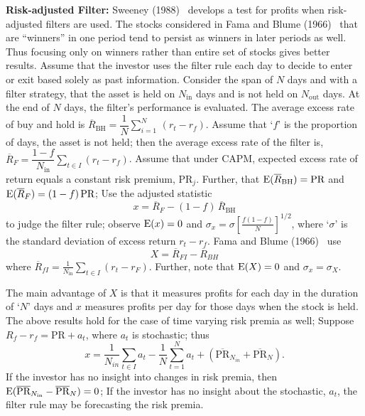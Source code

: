 \noindent \textbf{Risk-adjusted Filter:} Sweeney (1988)~\cite{sweet} develops a test for profits when risk-adjusted filters are used. The stocks considered in Fama and Blume (1966)~\cite{famablume} that are ``winners'' in one period tend to persist as winners in later periods as well. Thus focusing only on winners rather than entire set of stocks gives better results. Assume that the investor uses the filter rule each day to decide to enter or exit based solely as past information. Consider the span of $N$ days and with a filter strategy, that the asset is held on $N_{\text{in}}$ days and is not held on $N_{\text{out}}$ days. At the end of $N$ days, the filter's performance is evaluated. The average excess rate of buy and hold is $\overline{R}_{\text{BH}}=\dfrac{1}{N} \sum_{i=1}^N \, (r_t - r_f )$. Assume that `$f$' is the proportion of days, the asset is not held; then the average excess rate of the filter is, $\overline{R}_{F}=\dfrac{1-f}{N_{\text{in}}} \sum_{t \in I} (r_t - r_f)$. Assume that under CAPM, expected excess rate of return equals a constant risk premium, $\text{PR}_{j}$. Further, that $\operatorname{E}(\overline{R}_{\text{BH}}) = \text{PR}$ and $\operatorname{E}(\overline{R}_{F}) = (1 - f)\,\text{PR}$; Use the adjusted statistic
	\begin{equation} \label{eqn:xbarfirst}
	x= \overline{R}_{F} - (1 - f)\, \overline{R}_{\text{BH}}
	\end{equation}
to judge the filter rule; observe $\operatorname{E}(x) = 0$ and $\sigma_{x} = \sigma[\frac{f(1-f)}{N}]^{1/2}$, where `$\sigma$' is the standard deviation of excess return $r_t - r_f$. Fama and Blume (1966)~\cite{famablume} use
	\begin{equation} \label{eqn:bigxbar}
	X = \overline{R}_{FI} - \overline{R}_{BH}
	\end{equation}
where $\overline{R}_{fI} = \frac{1}{N_{\text{in}}} \sum_{t \in I}(r_t - r_F)$. Further, note that $\operatorname{E}(X) = 0$ and $\sigma_{x} = \sigma_{X}$.


The main advantage of $X$ is that it measures profits for each day in the duration of `$N$' days and $x$ measures profits per day for those days when the stock is held. The above results hold for the case of time varying risk premia as well; Suppose $R_f - r_f = \text{PR} + a_t$, where $a_t$ is stochastic; thus
	\begin{equation} \label{eqn:anotherxeq}
	x = \dfrac{1}{N_{in}} \sum_{t \in I} a_t - \dfrac{1}{N} \sum_{t=1}^N a_t + (\overline{\text{PR}}_{N_{in} }+\overline{\text{PR}}_N ).
	\end{equation}
If the investor has no insight into changes in risk premia, then $\operatorname{E}(\overline{\text{PR}}_{N_{\text{in}}} - \overline{\text{PR}}_{N}) = 0$; If the investor has no insight about the stochastic, $a_t$, the filter rule may be forecasting the risk premia.


